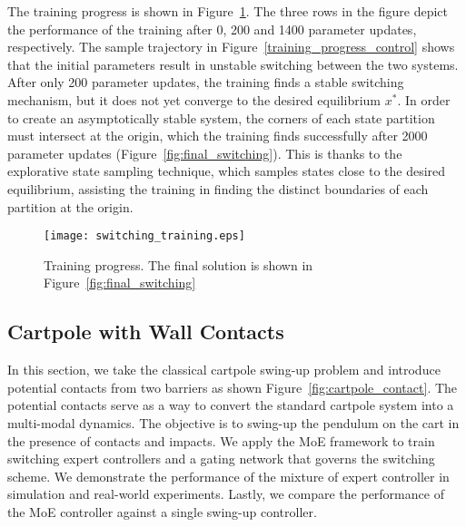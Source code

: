 The training progress is shown in Figure~\ref{fig:switching_training}.
%
The three rows in the figure depict the performance of the training after 0, 200
and 1400 parameter updates, respectively.
%
The sample trajectory in Figure~\ref{training_progress_control} shows that the
initial parameters result in unstable switching between the two systems.
%
After only 200 parameter updates, the training finds a stable switching
mechanism, but it does not yet converge to the desired equilibrium $x^*$.
%
In order to create an asymptotically stable system, the corners of each state
partition must intersect at the origin, which the training finds successfully
after 2000 parameter updates (Figure~\ref{fig:final_switching}).
%
This is thanks to the explorative state sampling technique, which samples states
close to the desired equilibrium, assisting the training in finding the distinct
boundaries of each partition at the origin. 
\begin{figure}[H]
    \centering
    \texttt{[image: switching\_training.eps]}
    \caption{Training progress. The final solution is shown in
    Figure~\ref{fig:final_switching}}
    \label{fig:switching_training}
\end{figure}


\subsection{Cartpole with Wall Contacts}
\label{ssec:cartpole_with_walls}

In this section, we take the classical cartpole swing-up problem and introduce
potential contacts from two barriers as shown Figure~\ref{fig:cartpole_contact}. 
%
The potential contacts serve as a way to convert the standard cartpole system
into a multi-modal dynamics.
%
The objective is to swing-up the pendulum on the cart in the presence of
contacts and impacts.
%
We apply the MoE framework to train switching expert controllers and a gating
network that governs the switching scheme.
%
We demonstrate the performance of the mixture of expert controller in
simulation and real-world experiments.
%
Lastly, we compare the performance of the MoE controller against
a single swing-up controller. 

